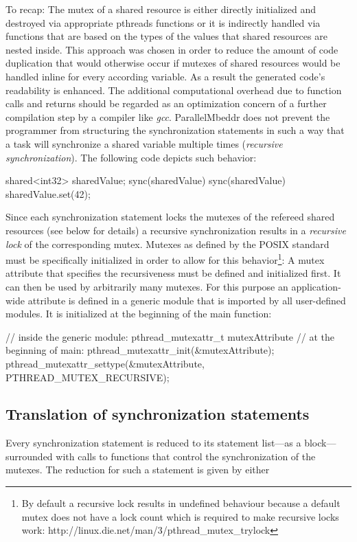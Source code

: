 To recap: The mutex of a shared resource is either directly initialized and destroyed via appropriate pthreads functions or it is indirectly handled via functions that are based on the types of the values that shared resources are nested inside. This approach was chosen in order to reduce the amount of code duplication that would otherwise occur if mutexes of shared resources would be handled inline for every according variable. As a result the generated code's readability is enhanced. The additional computational overhead due to function calls and returns should be regarded as an optimization concern of a further compilation step by a compiler like \textit{gcc}.
ParallelMbeddr does not prevent the programmer from structuring the synchronization statements in such a way that a task will synchronize a shared variable multiple times (\textit{recursive synchronization}). The following code depicts such behavior:
\begin{ccode}
shared<int32> sharedValue;
sync(sharedValue) {
  sync(sharedValue) {
    sharedValue.set(42);
  }
}
\end{ccode}
Since each synchronization statement locks the mutexes of the refereed shared resources (see below for details) a recursive synchronization results in a \textit{recursive lock} of the corresponding mutex. Mutexes as defined by the POSIX standard must be specifically initialized in order to allow for this behavior\footnote{By default a recursive lock results in undefined behaviour because a default mutex does not have a lock count which is required to make recursive locks work: http://linux.die.net/man/3/pthread\_mutex\_trylock}: A mutex attribute that specifies the recursiveness must be defined and initialized first. It can then be used by arbitrarily many mutexes. 
For this purpose an application-wide attribute is defined in a generic module that is imported by all user-defined modules. It is initialized at the beginning of the main function:
\begin{ccode}
// inside the generic module:
pthread_mutexattr_t mutexAttribute
// at the beginning of main:
pthread_mutexattr_init(&mutexAttribute);
pthread_mutexattr_settype(&mutexAttribute, PTHREAD_MUTEX_RECURSIVE);
\end{ccode}

\subsection{Translation of synchronization statements}
Every synchronization statement is reduced to its statement list---as a block---surrounded with calls to functions that control the synchronization of the mutexes. The reduction for such a statement is given by either

